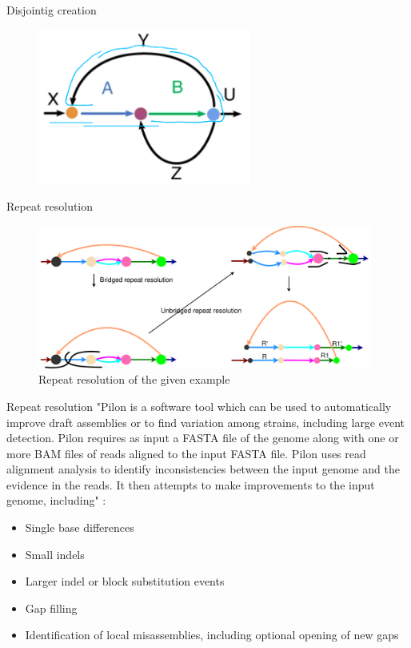 \documentclass{beamer}
\begin{document}
  \begin{frame}{Disjointig creation}
    \begin{figure}
      \includegraphics[width=7cm]{presentation/images/repeat_graph_dot3.png}
      \label{fig:repgraph3}
    \end{figure}
  \end{frame}

  \begin{frame}{Repeat resolution}
    \begin{figure}
      \includegraphics[width=11cm]{presentation/images/repeat_resolution.png}
      \caption*{Repeat resolution of the given example \cite{kolmogorov_assembly_2019}}
      \label{fig:contig_improvements}
    \end{figure}
  \end{frame}

  \begin{frame}{Repeat resolution}
    "Pilon is a software tool which can be used to automatically improve draft assemblies or to find variation among strains, including large event detection. Pilon requires as input a FASTA file of the genome along with one or more BAM files of reads aligned to the input FASTA file. Pilon uses read alignment analysis to identify inconsistencies between the input genome and the evidence in the reads. It then attempts to make improvements to the input genome, including" \cite{walker_pilon_2014}:

    \begin{itemize}
      \item Single base differences
      \item Small indels
      \item Larger indel or block substitution events
      \item Gap filling
      \item Identification of local misassemblies, including optional opening of new gaps
    \end{itemize}
  \end{frame}
\end{document}
